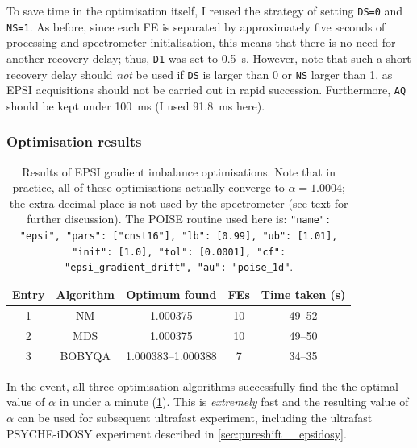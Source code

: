 To save time in the optimisation itself, I reused the strategy of setting \texttt{DS=0} and \texttt{NS=1}.
As before, since each FE is separated by approximately five seconds of processing and spectrometer initialisation, this means that there is no need for another recovery delay; thus, \texttt{D1} was set to \qty{0.5}{\s}.
However, note that such a short recovery delay should \textit{not} be used if \texttt{DS} is larger than 0 or \texttt{NS} larger than 1, as EPSI acquisitions should not be carried out in rapid succession.
Furthermore, \texttt{AQ} should be kept under \qty{100}{\ms} (I used \qty{91.8}{\ms} here).


\subsubsection{Optimisation results}

\begin{table}[htb]
    \centering
    \begin{tabular}{ccccc}
        \toprule
        Entry & Algorithm & Optimum found      & FEs & Time taken (\unit{\s}) \\
        \midrule
        1     & NM        & 1.000375           & 10  & 49--52               \\
        2     & MDS       & 1.000375           & 10  & 49--50               \\
        3     & BOBYQA    & 1.000383--1.000388 & 7   & 34--35               \\
        \bottomrule
    \end{tabular}
    \caption[EPSI gradient imbalance optimisations]{
        Results of EPSI gradient imbalance optimisations.
        Note that in practice, all of these optimisations actually converge to $\alpha = 1.0004$; the extra decimal place is not used by the spectrometer (see text for further discussion).
        The POISE routine used here is: \texttt{{"name": "epsi", "pars": ["cnst16"], "lb": [0.99], "ub": [1.01], "init": [1.0], "tol": [0.0001], "cf": "epsi_gradient_drift", "au": "poise_1d"}}.
    }
    \label{tbl:poise_epsi}
\end{table}

In the event, all three optimisation algorithms successfully find the the optimal value of $\alpha$ in under a minute (\cref{tbl:poise_epsi}).
This is \textit{extremely} fast and the resulting value of $\alpha$ can be used for  subsequent ultrafast experiment, including the ultrafast PSYCHE-iDOSY experiment described in \cref{sec:pureshift__epsidosy}.

